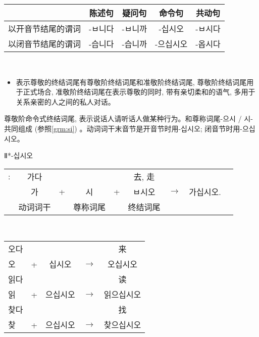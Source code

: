 \begin{grammar}
\begin{grammarsect}[尊敬阶终结词尾]
\begin{tabular}{|c|c|c|c|c|}
			\diagbox{谓词类型}{句子类型} & 陈述句      & 疑问句      & 命令句       & 共动句      \\\hline
			以开音节结尾的谓词            & \kr -ㅂ니다 & \kr -ㅂ니까 & \kr -십시오  & \kr -ㅂ시다 \\\hline
			以闭音节结尾的谓词            & \kr -습니다 & \kr -습니까 & \kr -으십시오 & \kr -옵시다 \\\hline
		\end{tabular}\\
		\begin{itemize}
			\item 表示尊敬的终结词尾有尊敬阶终结词尾和准敬阶终结词尾, 尊敬阶终结词尾用于正式场合, 准敬阶终结词尾在表示尊敬的同时, 带有亲切柔和的语气, 多用于关系亲密的人之间的私人对话。
		\end{itemize}
	\end{grammarsect}
	\begin{grammarsect}[\kr -ㅂ시오]\label{grm:bsio}
		\begin{itemize}
			\item 尊敬阶命令式终结词尾, 表示说话人请听话人做某种行为。和尊称词尾{\kr -으시 / 시-}共同组成 (参照\ref{grm:si}) 。动词词干末音节是开音节时用{\kr -십시오};
			      闭音节时用{\kr -으십시오}。
			      {\color{gray} \item Ⅱ*{\kr -십시오}}
		\end{itemize}
		\begin{tabular}{ccccccccc}
			\kr \ruby{例}{예}: & \kr 가다 &   &       &   & 去, 走                        \\
			                 & \kr 가  & + & \kr 시 & + & \kr ㅂ시오 & $\to$ & \kr 가십시오. \\\cline{2-2}\cline{4-4}\cline{6-6}
			                 & 动词词干   &   & 尊称词尾  &   & 终结词尾
		\end{tabular}\\
		\begin{tabular}{lcccc}
			\kr 오다 &   &          &       & 来         \\
			\kr 오  & + & \kr 십시오  & $\to$ & \kr 오십시오  \\
			\kr 읽다 &   &          &       & 读         \\
			\kr 읽  & + & \kr 으십시오 & $\to$ & \kr 읽으십시오 \\
			\kr 찾다 &   &          &       & 找         \\
			\kr 찾  & + & \kr 으십시오 & $\to$ & \kr 찾으십시오
		\end{tabular}\\

\end{grammarsect}
\end{grammar}
